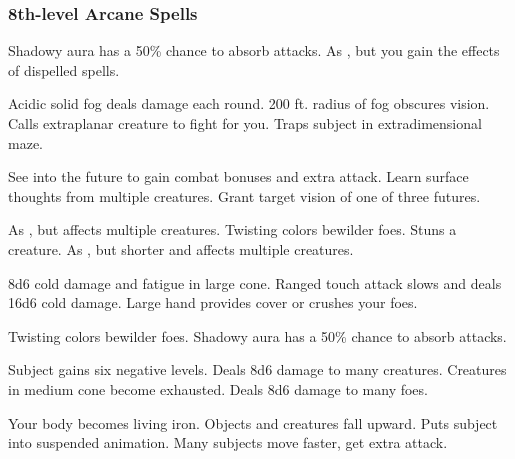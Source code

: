 \subsubsection{8th-level Arcane Spells} 
\begin{swspelllist}
     Shadowy aura has a 50\% chance to absorb attacks. 
     As , but you gain the effects of dispelled spells.

     Acidic solid fog deals damage each round.
     200 ft. radius of fog obscures vision.
     Calls extraplanar creature to fight for you.
     Traps subject in extradimensional maze.

     See into the future to gain combat bonuses and extra attack.
     Learn surface thoughts from multiple creatures.
     Grant target vision of one of three futures.

     As , but affects multiple creatures.
     Twisting colors bewilder foes.
     Stuns a creature.
     As , but shorter and affects multiple creatures.

     8d6 cold damage and fatigue in large cone.
     Ranged touch attack slows and deals 16d6 cold damage.
    \spellhead{}
     Large hand provides cover or crushes your foes.

     Twisting colors bewilder foes.
     Shadowy aura has a 50\% chance to absorb attacks. 
    \spellheadrestricted{}

     Subject gains six negative levels.
     Deals 8d6 damage to many creatures.
     Creatures in medium cone become exhausted.
     Deals 8d6 damage to many foes.

     Your body becomes living iron.
     Objects and creatures fall upward.
    \M Puts subject into suspended animation.
     Many subjects move faster, get extra attack.
\end{swspelllist}

